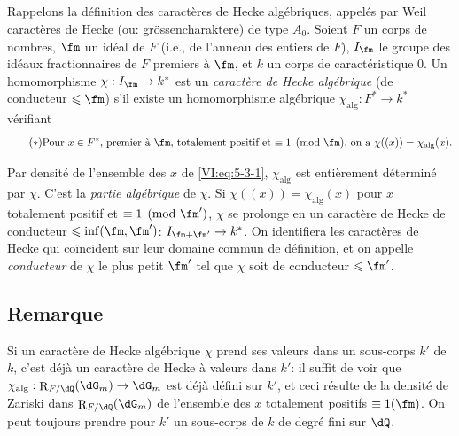 \documentclass[oneside]{book}
\DeclareMathOperator{\res}{R} %
\newcounter{char}
\theoremstyle{sga-source}
\theoremstyle{sga-source-dash}
\theoremstyle{sga-source-dotdash}
\theoremstyle{sga-source-number-note-dash}
\theoremstyle{sga-source-note-number-dotdash}
\theoremstyle{sga-source-example-dotdash}
\theoremstyle{sga-source-inline-number}
\theoremstyle{sga-source-bare-number}
\theoremstyle{sga-source}
\newcommand{\PrintPage}[1]{}\newcommand{\MathPage}[1]{}\newcommand{\PrintCite}[2]{#1}\newcommand{\var}[3]{#2}
\begin{document}
\subsection{}\label{VI:5-3}

Rappelons la définition des caractères de Hecke algébriques, appelés 
par Weil caractères de Hecke (ou: gr\"ossencharaktere) de type $A_0$. Soient $F$ 
un corps de nombres, $\fm$ un idéal de $F$ (i.e., de l'anneau des entiers de 
$F$), $I_\fm$ le groupe des idéaux fractionnaires de $F$ premiers à $\fm$, 
et $k$ un corps de caractéristique $0$. Un homomorphisme 
$\chi:I_\fm \to k^\ast$ est un \emph{caractère de Hecke algébrique} (de 
conducteur $\leqslant \fm$) s'il existe un homomorphisme algébrique 
$\chi_\text{alg}:F^\ast \to k^\ast$ vérifiant 
\begin{equation*}\tag{$*$}\label{VI:eq:5-3-1}
\text{Pour $x\in F^\ast$, premier à $\fm$, totalement positif et 
$\equiv 1\pmod\fm$, on a $\chi((x))=\chi_\text{alg}(x)$.}
\end{equation*}

Par densité de l'ensemble des $x$ de \eqref{VI:eq:5-3-1}, $\chi_\text{alg}$ 
est entièrement déterminé par $\chi$. C'est la \emph{partie algébrique} 
de $\chi$. Si $\chi((x))=\chi_\text{alg}(x)$ pour $x$ totalement positif et 
$\equiv 1\pmod{\fm'}$, $\chi$ se prolonge en un caractère de Hecke de 
conducteur $\leqslant \inf(\fm,\fm')$: $I_{\fm+\fm'}\to k^\ast$. On 
identifiera les caractères de Hecke qui coïncident sur leur domaine commun de 
définition, et on appelle \emph{conducteur} de $\chi$ le plus petit $\fm'$ 
tel que $\chi$ soit de conducteur $\leqslant \fm'$. 





\PrintPage{210}
\subsection{Remarque}\label{VI:5-4}

Si un caractère de Hecke algébrique $\chi$ prend ses valeurs dans un 
sous-corps $k'$ de $k$, c'est déjà un caractère de Hecke à valeurs dans 
$k'$: il suffit de voir que $\chi_\text{alg}:\res_{F/\dQ}(\dG_m) \to \dG_m$ 
est déjà défini sur $k'$, et ceci résulte de la densité de Zariski 
dans $\res_{F/\dQ}(\dG_m)$ de l'ensemble \var{des $x$ totalement positif}{des $x$ totalement positifs}{S45-SOL-0875} 
$\equiv 1(\fm)$. \var{On pour toujours prendre}{On peut toujours prendre}{S45-SOL-0877} pour $k'$ un sous-corps de $k$ de 
degré fini sur $\dQ$. 
\end{document}
